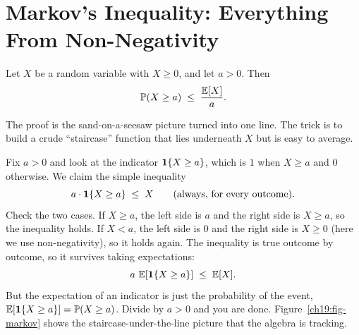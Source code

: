 \section{Markov's Inequality: Everything From Non-Negativity}
\label{ch19:markov}

\begin{theorem}
\label{ch19:markov-thm}
Let $X$ be a random variable with $X \ge 0$, and let $a > 0$. Then
\[
  \operatorname{\mathbb{P}}(X \ge a) \;\le\; \frac{\operatorname{\mathbb{E}}[X]}{a}.
\]
\end{theorem}

\begin{whybox}
The proof is the sand-on-a-seesaw picture turned into one line. The trick is to
build a crude ``staircase'' function that lies underneath $X$ but is easy to
average.

Fix $a>0$ and look at the indicator $\mathbf{1}\{X \ge a\}$, which is $1$ when
$X \ge a$ and $0$ otherwise. We claim the simple inequality
\[
  a \cdot \mathbf{1}\{X \ge a\} \;\le\; X
  \qquad \text{(always, for every outcome).}
\]
Check the two cases. If $X \ge a$, the left side is $a$ and the right side is
$X \ge a$, so the inequality holds. If $X < a$, the left side is $0$ and the
right side is $X \ge 0$ (here we use non-negativity), so it holds again. The
inequality is true outcome by outcome, so it survives taking expectations:
\[
  a\,\operatorname{\mathbb{E}}\!\left[\mathbf{1}\{X\ge a\}\right] \;\le\; \operatorname{\mathbb{E}}[X].
\]
But the expectation of an indicator is just the probability of the event,
$\operatorname{\mathbb{E}}[\mathbf{1}\{X\ge a\}] = \operatorname{\mathbb{P}}(X\ge a)$. Divide by $a>0$ and you are done.
Figure~\ref{ch19:fig-markov} shows the staircase-under-the-line picture that
the algebra is tracking.
\end{whybox}


